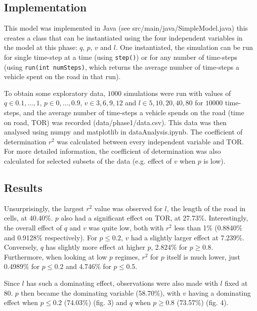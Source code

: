 \documentclass{article}
\begin{document}
\subsection*{Implementation}

This model was implemented in Java (see src/main/java/SimpleModel.java) this creates a class that can be instantiated using the four independent variables in the model at this phase: $q$, $p$, $v$ and $l$. One instantiated, the simulation can be run for single time-step at a time (using \texttt{step()}) or for any number of time-steps (using \texttt{run(int numSteps)}, which returns the average number of time-steps a vehicle spent on the road in that run).

To obtain some exploratory data, $1000$ simulations were run with values of $q \in {0.1, ... , 1}$, $p \in {0, ... , 0.9}$, $v \in {3, 6, 9, 12}$ and $l \in {5, 10, 20, 40, 80}$ for $10000$ time-steps, and the average number of time-steps a vehicle spends on the road (time on road, TOR) was recorded (data/phase1/data.csv). This data was then analysed using numpy and matplotlib in dataAnalysis.ipynb. The coefficient of determination $r^{2}$ was calculated between every independent variable and TOR. For more detailed information, the coefficient of determination was also calculated for selected subsets of the data (e.g. effect of $v$ when $p$ is low).

\subsection*{Results}

Unsurprisingly, the largest $r^{2}$ value was observed for $l$, the length of the road in cells, at 40.40\%. $p$ also had a significant effect on TOR, at 27.73\%. Interestingly, the overall effect of $q$ and $v$ was quite low, both with $r^{2}$ less than 1\% (0.8840\% and 0.9128\% respectively). For $p \leq 0.2$, $v$ had a slightly larger effect at 7.239\%. Conversely, $q$ has slightly more effect at higher $p$, 2.824\% for $p \geq 0.8$. Furthermore, when looking at low $p$ regimes, $r^{2}$ for $p$ itself is much lower, just 0.4989\% for $p \leq 0.2$ and 4.746\% for $p \leq 0.5$.

Since $l$ has such a dominating effect, observations were also made with $l$ fixed at 80. $p$ then became the dominating variable (58.70\%), with $v$ having a dominating effect when $p \leq 0.2$ (74.03\%) (fig. 3) and $q$ when $p \geq 0.8$ (73.57\%) (fig. 4).
\end{document}
